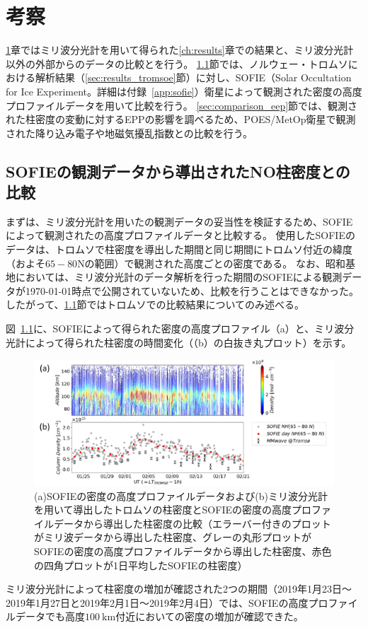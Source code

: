 \chapter{考察}
\label{ch:discussion}
\ref{ch:discussion}章ではミリ波分光計を用いて得られた\ref{ch:results}章での結果と、ミリ波分光計以外の外部からのデータの比較とを行う。
\ref{sec:comparison_sofie}節では、ノルウェー・トロムソにおける解析結果（\ref{sec:results_tromsoe}節）に対し、SOFIE（Solar Occultation for Ice Experiment。詳細は付録~\ref{app:sofie}）衛星によって観測された密度の高度プロファイルデータを用いて比較を行う。
\ref{sec:comparison_eep}節では、観測された柱密度の変動に対するEPPの影響を調べるため、POES/MetOp衛星で観測された降り込み電子や地磁気擾乱指数との比較を行う。


\section{SOFIEの観測データから導出されたNO柱密度との比較}
\label{sec:comparison_sofie}
まずは、ミリ波分光計を用いたの観測データの妥当性を検証するため、SOFIEによって観測されたの高度プロファイルデータと比較する。
使用したSOFIEのデータは、トロムソで柱密度を導出した期間と同じ期間にトロムソ付近の緯度（およそ$65 - 80$\textdegree Nの範囲）で観測された高度ごとの密度である。
なお、昭和基地においては、ミリ波分光計のデータ解析を行った期間のSOFIEによる観測データが\today 時点で公開されていないため、比較を行うことはできなかった。
したがって、\ref{sec:comparison_sofie}節ではトロムソでの比較結果についてのみ述べる。\par

図~\ref{fig:sofie_mmcd}に、SOFIEによって得られた密度の高度プロファイル（a）と、ミリ波分光計によって得られた柱密度の時間変化（（b）の白抜き丸プロット）を示す。
\begin{figure}[htbp]
    \centering
    \includegraphics[width=\linewidth]{master_thesis_contents/master_thesis_fig/sofie_mmcd.pdf}
    \caption{(a)SOFIEの密度の高度プロファイルデータおよび(b)ミリ波分光計を用いて導出したトロムソの柱密度とSOFIEの密度の高度プロファイルデータから導出した柱密度の比較（エラーバー付きのプロットがミリ波データから導出した柱密度、グレーの丸形プロットがSOFIEの密度の高度プロファイルデータから導出した柱密度、赤色の四角プロットが1日平均したSOFIEの柱密度）}
    \label{fig:sofie_mmcd}
\end{figure}
ミリ波分光計によって柱密度の増加が確認された2つの期間（2019年1月23日〜2019年1月27日と2019年2月1日〜2019年2月4日）では、SOFIEの高度プロファイルデータでも高度$100\ \mathrm{km}$付近においての密度の増加が確認できた。\par

